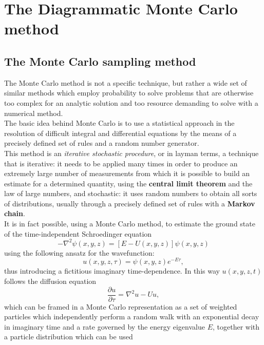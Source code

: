 \section{The Diagrammatic Monte Carlo method}
\subsection{The Monte Carlo sampling method}
The Monte Carlo method is not a specific technique, but rather a wide set of similar methods which employ probability to solve problems 
that are otherwise too complex for an analytic solution and too resource demanding to solve with a numerical method.\\
The basic idea behind Monte Carlo is to use a statistical approach in the resolution of difficult integral and differential equations 
\cite{metropolis1949monte} by the means of a precisely defined set of rules and a random number generator.\\
This method is an \textit{iterative stochastic procedure}, or in layman terms, a technique that is iterative: it needs to be applied many times in 
order to produce an extremely large number of measurements from which it is possible to build an estimate for a determined quantity, 
using the \textbf{central limit theorem} and the law of large numbers, and stochastic: it uses random numbers to obtain all sorts of distributions, 
usually through a precisely defined set of rules with a \textbf{Markov chain}.\\
It is in fact possible, using a Monte Carlo method, to estimate the ground state of the time-independent Schroedinger equation \cite{gubernatis2016quantum}
\begin{equation}
    -\nabla^2\psi(x,y,z)=\left[E-U(x,y,z)\right]\psi(x,y,z)
\end{equation}
using the following ansatz for the wavefunction:
\begin{equation}
    u(x,y,z,\tau)=\psi(x,y,z)e^{-E\tau},
\end{equation}
thus introducing a fictitious imaginary time-dependence. In this way $u(x,y,z,t)$ follows the diffusion equation
\begin{equation}
    \frac{\partial u}{\partial \tau}=\nabla^2u-Uu,
\end{equation}
which can be framed in a Monte Carlo representation as a set of weighted particles which independently perform a random walk with an 
exponential decay in imaginary time and a rate governed by the energy eigenvalue $E$, together with a particle distribution which can be used 
